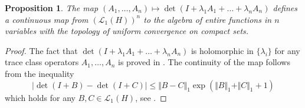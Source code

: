 \documentclass[12pt]{amsart}
\newcommand{\Lc}{\mathcal{L}}
\theoremstyle{plain}
\newtheorem{proposition}[lemma]{Proposition}
\theoremstyle{definition}
\numberwithin{equation}{section}
\begin{document}
\begin{proposition}\label{p58} The map $(A_1,\dots,A_n)\mapsto \det (I+\lambda_1
A_1+\dots+\lambda_n A_n)$ defines a continuous map from $(\Lc_1(H))^n$
to the algebra of entire functions in $n$ variables with the topology of
uniform convergence on compact sets.
\end{proposition} 
\begin{proof} The fact that $\det (I+\lambda_1 A_1+\dots+\lambda_n A_n)$ is
holomorphic in $\{\lambda_i\}$ for any trace class operators
$A_1,\dots,A_n$ is proved in \cite{Si}. The continuity of the map follows
from the inequality
%
\begin{equation*}
|\det(I+B)-\det(I+C)|\le\Vert B-C\Vert_1\exp(\Vert B\Vert_1+ \Vert
C\Vert_1+1)
\end{equation*}
%
which holds for any $B,C\in \Lc_1(H)$, see \cite{SS,Si2}.
\end{proof}
\end{document}
